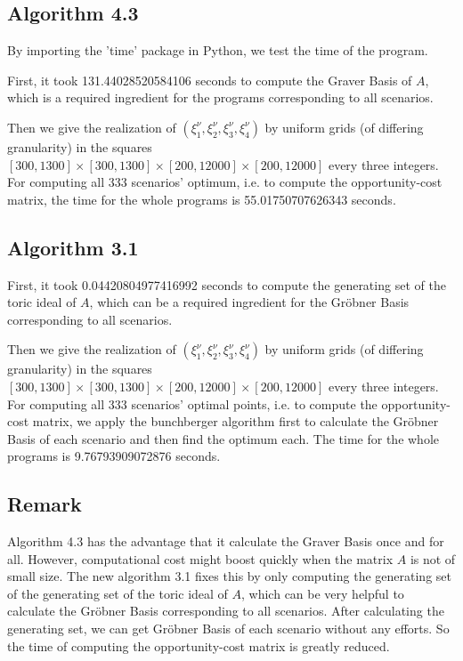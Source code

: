 \documentclass{article}
\theoremstyle{plain}
\theoremstyle{definition}
\begin{document}
\begin{propsition}
\subsection{Algorithm 4.3}
By importing the 'time' package in Python,  we test the time of the program. 

First, it took 131.44028520584106 seconds to compute the Graver Basis of $A$, which is a required ingredient for the programs corresponding to all scenarios. 

Then we give the realization of $\left(\xi_{1}^{\nu}, \xi_{2}^{\nu}, \xi_{3}^{\nu}, \xi_{4}^{\nu}\right)$   by uniform grids (of differing granularity) in the squares $ [300,1300] \times [300,1300]\times [200,12000] \times[200,12000]$ every three integers. For computing all 333 scenarios' optimum, i.e. to compute the opportunity-cost matrix, the time for the whole programs is  55.01750707626343 seconds.

\subsection{Algorithm 3.1}
First, it took 0.04420804977416992 seconds  to compute the generating set of the toric ideal of $A$, which can be  a required ingredient for the Gröbner Basis corresponding to all scenarios. 

Then we give the realization of $\left(\xi_{1}^{\nu}, \xi_{2}^{\nu}, \xi_{3}^{\nu}, \xi_{4}^{\nu}\right)$   by uniform grids (of differing granularity) in the squares $ [300,1300] \times [300,1300]\times [200,12000] \times[200,12000]$ every three integers. For computing all 333 scenarios' optimal points, i.e. to compute the opportunity-cost matrix, we apply the bunchberger algorithm first to calculate the Gröbner Basis of each scenario and then find the optimum each.  The time for the whole programs is  9.76793909072876 seconds.

\subsection{Remark}
Algorithm 4.3 has the advantage that it calculate the Graver Basis once and for all. However, computational cost might boost quickly when the matrix $A$ is not of small size. The new algorithm 3.1 fixes this by only computing the generating set of the generating set of the toric ideal of $A$, which can be very helpful to calculate the Gröbner Basis corresponding to all scenarios. After calculating the generating set, we can get Gröbner Basis of each scenario without any efforts. So the time of computing the opportunity-cost matrix is greatly reduced.


\end{propsition}
\end{document}
